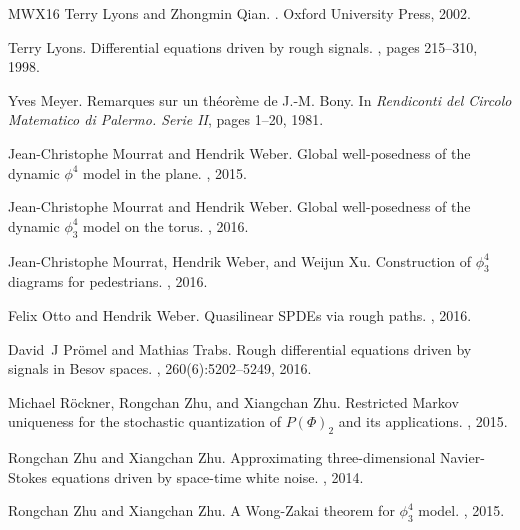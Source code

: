 \documentclass[a4paper, 11pt]{article}
\begin{document}
\begin{thebibliography}{MWX16}
Terry Lyons and Zhongmin Qian.
.
\newblock Oxford University Press, 2002.

Terry Lyons.
\newblock Differential equations driven by rough signals.
, pages 215--310, 1998.

Yves Meyer.
\newblock Remarques sur un théorème de {J}.-{M}. {Bony}.
\newblock In {\em Rendiconti del {Circolo} {Matematico} di {Palermo}. {Serie}
  {II}}, pages 1--20, 1981.

Jean-Christophe Mourrat and Hendrik Weber.
\newblock Global well-posedness of the dynamic $\phi^4$ model in the plane.
, 2015.

Jean-Christophe Mourrat and Hendrik Weber.
\newblock Global well-posedness of the dynamic $\phi^4_3$ model on the torus.
, 2016.

Jean-Christophe Mourrat, Hendrik Weber, and Weijun Xu.
\newblock Construction of $\phi^4_3$ diagrams for pedestrians.
, 2016.

Felix Otto and Hendrik Weber.
\newblock Quasilinear {SPDE}s via rough paths.
, 2016.

David~J Pr{\"o}mel and Mathias Trabs.
\newblock Rough differential equations driven by signals in {B}esov spaces.
, 260(6):5202--5249, 2016.

Michael R{\"o}ckner, Rongchan Zhu, and Xiangchan Zhu.
\newblock Restricted {M}arkov uniqueness for the stochastic quantization of
  {$P(\Phi)_2$} and its applications.
, 2015.

Rongchan Zhu and Xiangchan Zhu.
\newblock Approximating three-dimensional {N}avier-{S}tokes equations driven by
  space-time white noise.
, 2014.

Rongchan Zhu and Xiangchan Zhu.
\newblock A {W}ong-{Z}akai theorem for $\phi^4_3$ model.
, 2015.

\end{thebibliography}
\end{document}
